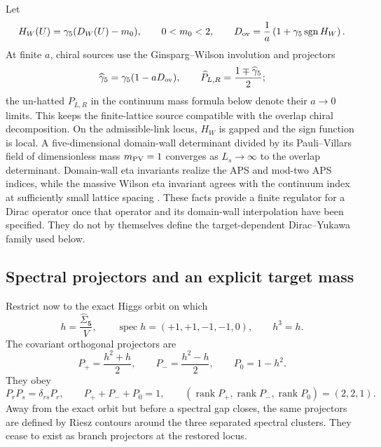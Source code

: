 \documentclass[11pt]{article}
\theoremstyle{definition}
\theoremstyle{remark}
\begin{document}
Let
\begin{equation}
 H_W(U)=\gamma_5(D_W(U)-m_0),\qquad 0<m_0<2,
 \qquad
 D_{\rm ov}=\frac1a\left(1+\gamma_5\operatorname{sgn}H_W\right).
 \label{eq:overlap}
\end{equation}
At finite \(a\), chiral sources use the Ginsparg--Wilson involution and
projectors
\begin{equation}
 \widehat\gamma_5=\gamma_5(1-aD_{\rm ov}),\qquad
 \widehat P_{L,R}=\frac{1\mp\widehat\gamma_5}{2};
 \label{eq:gw-projectors}
\end{equation}
the un-hatted \(P_{L,R}\) in the continuum mass formula below denote their
\(a\to0\) limits.  This keeps the finite-lattice source compatible with the
overlap chiral decomposition.
On the admissible-link locus, \(H_W\) is gapped and the sign function is
local.  A five-dimensional domain-wall determinant divided by its
Pauli--Villars field of dimensionless mass \(m_{\rm PV}=1\) converges as
\(L_s\to\infty\) to the overlap determinant.  Domain-wall eta invariants
realize the APS and mod-two APS indices, while the massive Wilson eta
invariant agrees with the continuum index at sufficiently small lattice
spacing \cite{FukayaOnogiYamaguchi2017,FukayaEtAl2022,AokiEtAl2025}.
These facts provide a finite regulator for a Dirac operator once that operator
and its domain-wall interpolation have been specified.  They do not by
themselves define the target-dependent Dirac--Yukawa family used below.

\subsection{Spectral projectors and an explicit target mass}

Restrict now to the exact Higgs orbit on which
\begin{equation}
 h=\frac{\widehat\Sigma_{\bm5}}V,
 \qquad \operatorname{spec}h=(+1,+1,-1,-1,0),
 \qquad h^3=h.
 \label{eq:higgs-h}
\end{equation}
The covariant orthogonal projectors are
\begin{equation}
 P_+=\frac{h^2+h}{2},\qquad
 P_-=\frac{h^2-h}{2},\qquad
 P_0=1-h^2.
 \label{eq:higgs-projectors}
\end{equation}
They obey
\begin{equation}
 P_rP_s=\delta_{rs}P_r,\qquad
 P_++P_-+P_0=1,\qquad
 (\operatorname{rank}P_+,\operatorname{rank}P_-,\operatorname{rank}P_0)
 =(2,2,1).
 \label{eq:projector-checks}
\end{equation}
Away from the exact orbit but before a spectral gap closes, the same
projectors are defined by Riesz contours around the three separated spectral
clusters.  They cease to exist as branch projectors at the restored locus.
\end{document}
